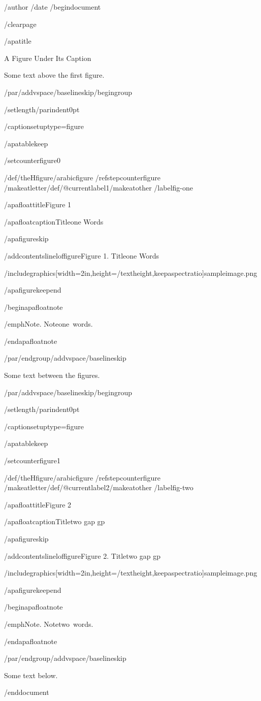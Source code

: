 /author{}
/date{}
/begin{document}


/clearpage

/apatitle{

A Figure Under Its Caption

}

Some text above the first figure.

/par/addvspace{/baselineskip}/begingroup

/setlength{/parindent}{0pt}

/captionsetup{type=figure}

/apatablekeep

/setcounter{figure}{0}

/def/theHfigure{/arabic{figure}}%
/refstepcounter{figure}%
/makeatletter/def/@currentlabel{1}/makeatother%
/label{fig-one}

/apafloattitle{Figure 1}

/apafloatcaption{Titleone Words}

/apafigureskip

/addcontentsline{lof}{figure}{Figure 1. Titleone Words}

/includegraphics[width=2in,height=/textheight,keepaspectratio]{sampleimage.png}

/apafigurekeepend

/begin{apafloatnote}

/emph{Note}. Noteone~words.

/end{apafloatnote}

/par/endgroup/addvspace{/baselineskip}

Some text between the figures.

/par/addvspace{/baselineskip}/begingroup

/setlength{/parindent}{0pt}

/captionsetup{type=figure}

/apatablekeep

/setcounter{figure}{1}

/def/theHfigure{/arabic{figure}}%
/refstepcounter{figure}%
/makeatletter/def/@currentlabel{2}/makeatother%
/label{fig-two}

/apafloattitle{Figure 2}

/apafloatcaption{Titletwo gap gp}

/apafigureskip

/addcontentsline{lof}{figure}{Figure 2. Titletwo gap gp}

/includegraphics[width=2in,height=/textheight,keepaspectratio]{sampleimage.png}

/apafigurekeepend

/begin{apafloatnote}

/emph{Note}. Notetwo~words.

/end{apafloatnote}

/par/endgroup/addvspace{/baselineskip}

Some text below.




/end{document}
